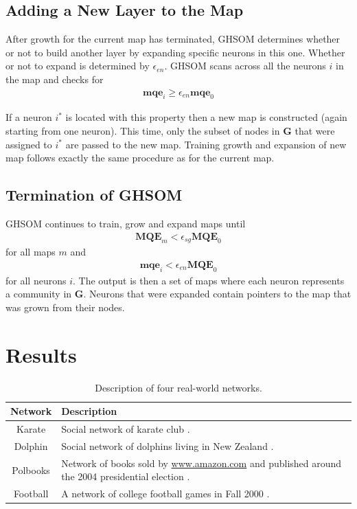 \documentclass{article}
\begin{document}
\subsection{Adding a New Layer to the Map}
After growth for the current map has terminated, GHSOM determines whether or not to build another layer by expanding specific neurons in this one. 
Whether or not to expand is determined by $\epsilon_{en}$. 
GHSOM scans across all the neurons $i$ in the map and checks for
\begin{align}
\textbf{mqe}_i \geq \epsilon_{en} \textbf{mqe}_0
\end{align}

If a neuron $i^*$ is located with this property then a new map is constructed (again starting from one neuron). 
This time, only the subset of nodes in $\textbf{G}$ that were assigned to $i^*$ are passed to the new map. 
Training growth and expansion of new map follows exactly the same procedure as for the current map.

\subsection{Termination of GHSOM}
GHSOM continues to train, grow and expand maps until 
\begin{align}
\textbf{MQE}_m < \epsilon_{sg} \textbf{MQE}_0
\end{align}
for all maps $m$ and
\begin{align}
\textbf{mqe}_i < \epsilon_{en} \textbf{MQE}_0
\end{align}
for all neurons $i$. 
The output is then a set of maps where each neuron represents a community in $\textbf{G}$.
Neurons that were expanded contain pointers to the map that was grown from their nodes.

\section{Results}


\begin{table}
\begin{tabular}{c p{6.5cm}}
\toprule
\textbf{Network} & \textbf{Description} \\
\bottomrule
Karate & Social network of karate club \cite{zachary1977information}.\\
Dolphin & Social network of dolphins living in New Zealand \cite{lusseau2003bottlenose}.\\
Polbooks & Network of books sold by \url{www.amazon.com} and published around the 2004 presidential election \cite{girvan2002community}.\\
Football & A network of college football games in Fall 2000 \cite{girvan2002community}.\\
\bottomrule
\end{tabular}
\caption{Description of four real-world networks.}
\end{table}
\end{document}
